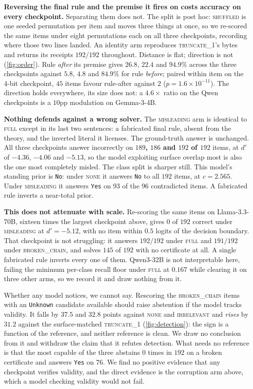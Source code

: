 \documentclass[10pt,twocolumn]{article}
\begin{document}
\textbf{Reversing the final rule and the premise it fires on costs accuracy on
every checkpoint.} Separating them does not. The split is post hoc:
\textsc{shuffled} is one seeded permutation per item and moves three things at
once, so we re-scored the same items under eight permutations each on all three
checkpoints, recording where those two lines landed. An identity arm reproduces
\textsc{truncate\_1}'s bytes and returns its receipts $192/192$ throughout.
Distance is flat; direction is not (\cref{fig:order}). Rule \emph{after} its
premise gives $26.8$, $22.4$ and $94.9\%$ across the three checkpoints against
$5.8$, $4.8$ and $84.9\%$ for rule \emph{before}; paired within item on the
4-bit checkpoint, $45$ items favour rule-after against $2$
($p = 1.6\times10^{-11}$). The direction holds everywhere, its size does not: a
$4.6\times$ ratio on the Qwen checkpoints is a $10$pp modulation on Gemma-3-4B.

\textbf{Nothing defends against a wrong solver.} The \textsc{misleading} arm is
identical to \textsc{full} except in its last two sentences: a fabricated final
rule, absent from the theory, and the inverted literal it licenses. The
ground-truth answer is unchanged. All three checkpoints answer incorrectly on
\textbf{$189$, $186$ and $192$ of $192$} items, at $d'$ of $-4.36$, $-4.06$ and
$-5.13$, so the model exploiting surface overlap most is also the one most
completely misled. The class split is sharper still. This model's standing prior
is \texttt{No}: under \textsc{none} it answers \texttt{No} to all $192$ items,
at $c = 2.565$. Under \textsc{misleading} it answers \texttt{Yes} on
$93$ of the $96$ contradicted items. A fabricated rule inverts a
near-total prior.

\textbf{This does not attenuate with scale.} Re-scoring the same items on
Llama-3.3-70B, sixteen times the largest checkpoint above, gives $0$ of $192$
correct under \textsc{misleading} at $d' = -5.12$, with no item within $0.5$
logits of the decision boundary. That checkpoint is not struggling: it answers
$192/192$ under \textsc{full} and $191/192$ under \textsc{broken\_chain}, and
solves $145$ of $192$ with no certificate at all. A single fabricated rule
inverts every one of them. Qwen3-32B is not interpretable here, failing the
minimum per-class recall floor under \textsc{full} at $0.167$ while clearing it
on three other arms, so we record it and draw nothing from it.

Whether any model notices, we cannot say. Rescoring the
\textsc{broken\_chain} items with an \texttt{Unknown} candidate available should
raise abstention if the model tracks validity. It falls by $37.5$ and $32.8$
points against \textsc{none} and \textsc{irrelevant} and \emph{rises} by
$31.2$ against the surface-matched \textsc{truncate\_1}
(\cref{fig:detection}): the sign is a function of the reference,
and neither reference is clean. We draw no conclusion from it and withdraw the
claim that it refutes detection. What needs no reference is that the most capable
of the three abstains $0$ times in $192$ on a broken certificate and
answers \texttt{Yes} on $76$. We find no positive evidence that any checkpoint
verifies validity, and the direct evidence is the corruption arm above, which a
model checking validity would not fail.
\end{document}
